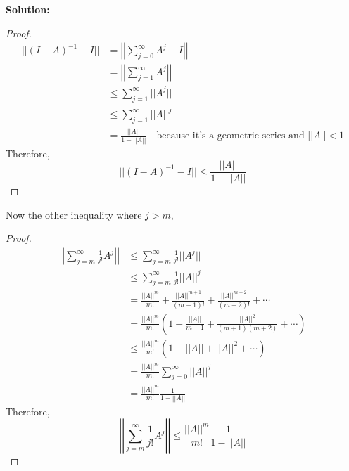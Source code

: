 \documentclass[12pt]{article}
\newenvironment{solution}{
    \textbf{Solution:}
    
}{
    
    \vspace{2em}
}
\begin{document}
\begin{solution}
    \begin{proof}
        \[
        \begin{aligned}
            ||(I - A)^{-1} - I||&= \left|\left|\sum_{j=0}^{\infty} A^j - I \right|\right| \\
            &= \left|\left|\sum_{j=1}^{\infty} A^j \right|\right| \\
            &\leq \sum_{j=1}^{\infty} ||A^j|| \\
            &\leq \sum_{j=1}^{\infty} ||A||^j \\
            &= \frac{||A||}{1 - ||A||} \quad \text{because it's a geometric series and } ||A|| < 1
        \end{aligned}
    \]
    Therefore,
    \[
        ||(I - A)^{-1} - I|| \leq \frac{||A||}{1 - ||A||}
    \]
    \end{proof}
    Now the other inequality where \(j > m\),
    \begin{proof}
        \[
            \begin{aligned}
                \left|\left|\sum_{j=m}^{\infty} \frac{1}{j!}A^j \right|\right| &\leq \sum_{j=m}^{\infty} \frac{1}{j!} ||A^j|| \\
                &\leq \sum_{j=m}^{\infty} \frac{1}{j!} ||A||^j \\
                &= \frac{||A||^m}{m!} + \frac{||A||^{m+1}}{(m+1)!} + \frac{||A||^{m+2}}{(m+2)!} + \cdots \\
                &= \frac{||A||^m}{m!} \left(1 + \frac{||A||}{m+1} + \frac{||A||^2}{(m+1)(m+2)} + \cdots \right) \\
                &\leq \frac{||A||^m}{m!} (1 + ||A|| + ||A||^2 + \cdots) \\
                &= \frac{||A||^m}{m!} \sum_{j=0}^{\infty} ||A||^j \\
                &= \frac{||A||^m}{m!} \frac{1}{1 - ||A||}
            \end{aligned}
        \]
    Therefore,
    \[
        \left|\left|\sum_{j=m}^{\infty} \frac{1}{j!}A^j \right|\right| \leq \frac{||A||^m}{m!}\frac{1}{1 - ||A||}
    \]
    \end{proof}
\end{solution}

\newpage
\end{document}

